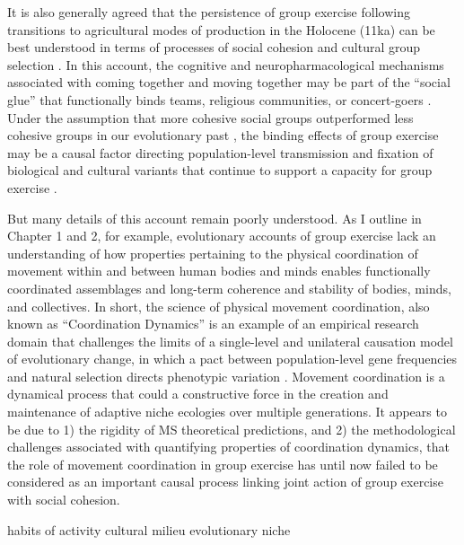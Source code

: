 It is also generally agreed that the persistence of group exercise following transitions to agricultural modes of production in the Holocene (11ka) can be best understood in terms of processes of social cohesion and cultural group selection \citep{Dunbar2010,Whitehouse2004,Cohen2017}.  In this account, the cognitive and neuropharmacological mechanisms associated with coming together and moving together may be part of the ``social glue'' that functionally binds teams, religious communities, or concert-goers \citep{Cohen2009,Fischer2014a}.  Under the assumption that more cohesive social groups outperformed less cohesive groups in our evolutionary past \citep{Turchin2013}, the binding effects of group exercise may be a causal factor directing population-level transmission and fixation of biological and cultural variants that continue to support a capacity for group exercise \citep{Claidiere2014,Henrich2015}.

But many details of this account remain poorly understood.  As I outline in Chapter 1 and 2, for example, evolutionary accounts of group exercise lack an understanding of how properties pertaining to the physical coordination of movement within and between human bodies and minds enables functionally coordinated assemblages and long-term coherence and stability of bodies, minds, and collectives.  In short, the science of physical movement coordination, also known as ``Coordination Dynamics'' \citep{Kelso2009} is an example of an empirical research domain that challenges the limits of a single-level and unilateral causation model of evolutionary change, in which a pact between population-level gene frequencies and natural selection directs phenotypic variation \citep{Dawkins1976,Grafen1984}.  Movement coordination is a dynamical process that could a constructive force in the creation and maintenance of adaptive niche ecologies over multiple generations.  It appears to be due to 1) the rigidity of MS theoretical predictions, and 2) the methodological challenges associated with quantifying properties of coordination dynamics, that the role of movement coordination in group exercise has until now failed to be considered as an important causal process linking joint action of group exercise with social cohesion.


habits of activity
cultural milieu
evolutionary niche

